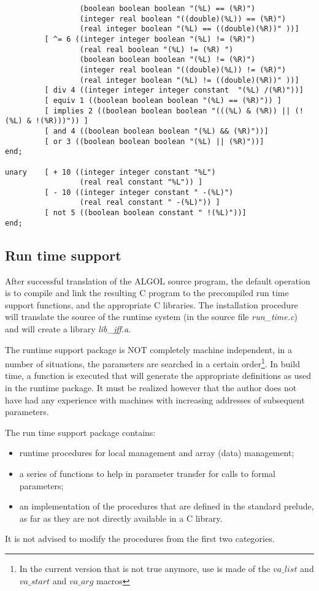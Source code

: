 \documentclass[11pt]{article}
\begin{document}
{\begin{verbatim}
                 (boolean boolean boolean "(%L) == (%R)")
                 (integer real boolean "((double)(%L)) == (%R)")
                 (real integer boolean "(%L) == ((double)(%R))" ))]
         [ ^= 6 ((integer integer boolean "(%L) != (%R)")
                 (real real boolean "(%L) != (%R) ")
                 (boolean boolean boolean "(%L) != (%R)")
                 (integer real boolean "((double)(%L)) != (%R)")
                 (real integer boolean "(%L) != ((double)(%R))" ))]
         [ div 4 ((integer integer integer constant  "(%L) /(%R)"))]
         [ equiv 1 ((boolean boolean boolean "(%L) == (%R)")) ]
         [ implies 2 ((boolean boolean boolean "(((%L) & (%R)) || (!(%L) & !(%R)))")) ]
         [ and 4 ((boolean boolean boolean "(%L) && (%R)"))]
         [ or 3 ((boolean boolean boolean "(%L) || (%R)"))]
end;

unary    [ + 10 ((integer integer constant "%L")
                 (real real constant "%L")) ]
         [ - 10 ((integer integer constant " -(%L)")
                 (real real constant " -(%L)")) ]
         [ not 5 ((boolean boolean constant " !(%L)"))]
end;
\end{verbatim}
}

\subsection{Run time support}

After successful translation of the ALGOL source program,
the default operation is to
compile and link the resulting C program to the precompiled run time support
functions, and the appropriate C libraries.
The installation procedure will translate the source of the
runtime system (in the source file {\em run\_time.c}) and will
create a library {\em lib\_jff.a}.

The runtime support package is NOT completely machine
independent,  in a number of situations, the parameters are searched in a certain order\footnote {In the current version that is not true anymore, use is made
of the $va\_list$ and $va\_start$ and $va\_arg$ macros}.
In build time, a function is executed that will
generate the appropriate definitions as used in the runtime package.
It must be realized however that the author does not have had any
experience with machines with increasing addresses of subsequent parameters.

The run time support package contains:
\begin{itemize}
\item runtime procedures for local management and array (data) management;
\item a series of functions to help in parameter transfer for calls to
formal parameters;
\item an implementation of the procedures that are
defined in the standard prelude, as far as they are not directly available
in a C library.
\end{itemize}
It is not advised to modify the procedures from the first two categories.
\end{document}
